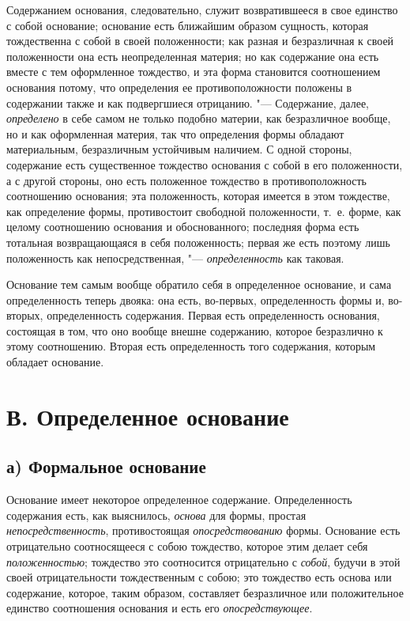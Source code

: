 Содержанием основания, следовательно, служит возвратившееся в свое единство
с собой основание; основание есть ближайшим образом сущность, которая
тождественна с собой в своей положенности; как разная и безразличная к
своей положенности она есть неопределенная материя; но как содержание она
есть вместе с тем оформленное тождество, и эта форма становится
соотношением основания потому, что определения ее противоположности
положены в содержании также и как подвергшиеся отрицанию. "--- Содержание,
далее, {\em определено} в себе самом не только подобно
материи, как безразличное вообще, но и как оформленная материя, так что
определения формы обладают материальным, безразличным устойчивым наличием.
С одной стороны, содержание есть существенное тождество основания с собой в
его положенности, а с другой стороны, оно есть положенное тождество в
противоположность соотношению основания; эта положенность, которая имеется
в этом тождестве, как определение формы, противостоит свободной
положенности, т.~е. форме, как целому соотношению основания и
обоснованного; последняя форма есть тотальная возвращающаяся в себя
положенность; первая же есть поэтому лишь положенность как
непосредственная, "--- {\em определенность} как таковая.

Основание тем самым вообще обратило себя в определенное основание, и сама
определенность теперь двояка: она есть, во-первых, определенность формы и,
во-вторых, определенность содержания. Первая есть определенность основания,
состоящая в том, что оно вообще внешне содержанию, которое безразлично к
этому соотношению. Вторая есть определенность того содержания, которым
обладает основание.


\section[В. Определенное основание]{В. Определенное основание}
\subsection[а) Формальное основание]{а) Формальное основание}

Основание имеет некоторое определенное
содержание. Определенность содержания есть, как выяснилось,
{\em основа} для формы, простая
{\em непосредственность}, противостоящая
{\em опосредствованию} формы. Основание есть
отрицательно соотносящееся с собою тождество, которое этим делает себя
{\em положенностью}; тождество это соотносится
отрицательно с {\em собой}, будучи в этой своей
отрицательности тождественным с собою; это тождество есть основа или
содержание, которое, таким образом, составляет безразличное или
положительное единство соотношения основания и есть его
{\em опосредствующее}.

